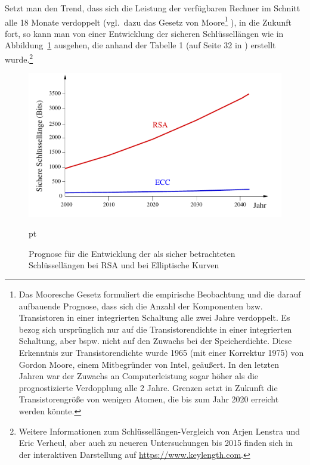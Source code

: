 \begin{refsegment}
Setzt man den Trend, dass sich die Leistung der verfügbaren Rechner im
Schnitt alle 18 Monate verdoppelt (vgl.\ dazu das Gesetz von
Moore\footnote{%
  Das Mooresche Gesetz formuliert die empirische Beobachtung und die darauf
  aufbauende Prognose, dass sich die Anzahl der Komponenten bzw. Transistoren
  in einer integrierten Schaltung alle zwei Jahre verdoppelt. Es bezog sich
  ursprünglich nur auf die Transistorendichte in einer integrierten Schaltung,
  aber bspw. nicht auf den Zuwachs bei der Speicherdichte.
  Diese Erkenntnis zur Transistorendichte wurde 1965 (mit einer Korrektur 1975)
  von Gordon Moore, einem Mitbegründer von Intel, geäußert.
  In den letzten Jahren war der Zuwachs an Computerleistung sogar höher als
  die prognostizierte Verdopplung alle 2 Jahre. Grenzen setzt in Zukunft die
  Transistorengröße von wenigen Atomen, die bis zum Jahr 2020 erreicht werden könnte.
}%
), in die Zukunft fort, so kann man von einer Entwicklung der
sicheren Schlüssellängen wie in Abbildung~\ref{RSAKeylength} ausgehen,
die anhand der Tabelle 1 (auf Seite 32 in \cite{LeVe2001}) erstellt
wurde.\footnote{%
  Weitere Informationen zum Schlüssellängen-Vergleich von Arjen Lenstra und
  Eric Verheul, aber auch zu neueren Untersuchungen bis 2015 finden sich
  in der interaktiven Darstellung auf \url{https://www.keylength.com}.
}

\begin{figure}[ht]
\begin{center}
\includegraphics[scale=0.7]{figures/RSAKeyLength-2}
\caption{Prognose für die Entwicklung der als sicher betrachteten
  Schlüssellängen bei RSA und bei Elliptische Kurven}
\label{RSAKeylength}
\end{center}
 pt
\end{figure}


\end{refsegment}
